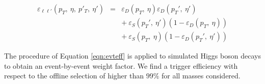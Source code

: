 \begin{eqnarray}
\label{eqn:evteff}
\varepsilon_{\ell\ell'}(p_T,\:\eta,\:p'_T,\:\eta') & = & \varepsilon_{D}(p_T,\:\eta) \varepsilon_{D}(p_T',\:\eta') \nonumber\\
               &   & +~\varepsilon_{S}(p_T',\:\eta')(1-\varepsilon_{D}(p_T,\:\eta)) \nonumber\\
               &   & +~\varepsilon_{S}(p_T,\:\eta)(1-\varepsilon_{D}(p_T',\:\eta'))
\end{eqnarray}

The procedure of Equation \ref{eqn:evteff} is applied to simulated Higgs boson decays to obtain an event-by-event weight factor. We find a 
trigger efficiency with respect to the offline selection of higher than $99\%$ for all masses considered.

